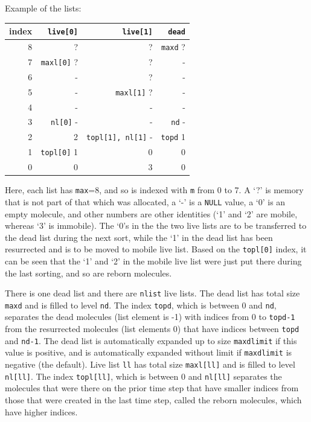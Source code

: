 \documentclass {scrbook}
\newcommand {\ttt} {\texttt}
\begin{document}
Example of the lists:

\begin{longtable}[c]{rrrr}
index & \ttt{live[0]} & \ttt{live[1]} & \ttt{dead}\\
\hline
8 & ? & ? & \ttt{maxd} ?\\
7 & \ttt{maxl[0]} ? & ? & -\\
6 & - & ? & -\\
5 & - & \ttt{maxl[1]} ? & -\\
4 & - & - & -\\
3 & \ttt{nl[0]} - & - & \ttt{nd} -\\
2 & 2 & \ttt{topl[1], nl[1]} - & \ttt{topd} 1\\
1 & \ttt{topl[0]} 1 & 0 & 0\\
0 & 0 & 3 & 0\\
 \end{longtable}

Here, each list has \ttt{max}=8, and so is indexed with \ttt{m} from 0 to 7. A `?' is memory that is not part of that which was allocated, a `-' is a \ttt{NULL} value, a `0' is an empty molecule, and other numbers are other identities (`1' and `2' are mobile, whereas `3' is immobile). The `0's in the the two live lists are to be transferred to the dead list during the next sort, while the `1' in the dead list has been resurrected and is to be moved to mobile live list. Based on the \ttt{topl[0]} index, it can be seen that the `1' and `2' in the mobile live list were just put there during the last sorting, and so are reborn molecules.

There is one dead list and there are \ttt{nlist} live lists. The dead list has total size \ttt{maxd} and is filled to level \ttt{nd}. The index \ttt{topd}, which is between 0 and \ttt{nd}, separates the dead molecules (list element is -1) with indices from 0 to \ttt{topd-1} from the resurrected molecules (list elements 0) that have indices between \ttt{topd} and \ttt{nd-1}. The dead list is automatically expanded up to size \ttt{maxdlimit} if this value is positive, and is automatically expanded without limit if \ttt{maxdlimit} is negative (the default). Live list \ttt{ll} has total size \ttt{maxl[ll]} and is filled to level \ttt{nl[ll]}. The index \ttt{topl[ll]}, which is between 0 and \ttt{nl[ll]} separates the molecules that were there on the prior time step that have smaller indices from those that were created in the last time step, called the reborn molecules, which have higher indices.
\end{document}
